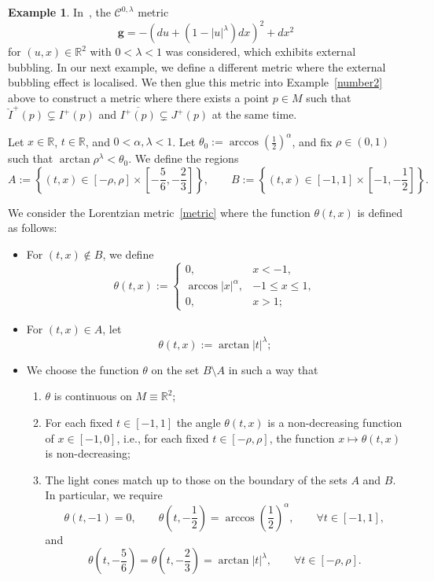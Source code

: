 \documentclass[reqno]{amsart}
\numberwithin{equation}{section}
\theoremstyle{plain}
\theoremstyle{definition}
\newtheorem{example}[theorem]{Example}
\theoremstyle{remark}
\newcommand\g{\ensuremath{\mathbf{g}}}
\newcommand\R{\ensuremath{\mathbb{R}}}
\renewcommand\le{\leqslant}
\newcommand\bel[1]{\begin{equation}\label{#1}}
\newcommand\ee{\end{equation}}
\begin{document}
\begin{example}
\label{number3}
In~\cite{CG:12}, the $\mathcal{C}^{0, \lambda}$ metric 
\bel{CGmetric}
\g = - \left( du + \left( 1 - |u|^{\lambda} \right) dx \right)^2 + dx^2
\ee
for $(u, x) \in \R^2$ with $0 < \lambda < 1$ was considered, which exhibits external bubbling. In our next example, we define a different metric where the external bubbling effect is localised. We then glue this metric into Example~\ref{number2} above to construct a metric where there exists a point $p \in M$ such that $\check{I}^+(p) \subsetneq I^+(p)$ and $\overline{I^+(p)} \subsetneq J^+(p)$ at the same time. 

Let $x \in \R$, $t \in \R$, and $0 < \alpha, \lambda < 1$. Let $\theta_0 := \arccos \left( \frac{1}{2} \right)^{\alpha}$, and fix $\rho \in \left( 0, 1 \right)$ such that $\arctan \rho^{\lambda} < \theta_0$. We define the regions 
\[
A := \left\{ (t, x) \in \left[ -\rho, \rho \right] \times \left[ -\frac{5}{6}, -\frac{2}{3} \right] \right\}, \qquad 
B := \left\{ (t, x) \in \left[ -1, 1 \right] \times \left[ -1, -\frac{1}{2} \right] \right\}. 
\]

We consider the Lorentzian metric~\eqref{metric} where the function $\theta(t, x)$ is defined as follows: 
\begin{itemize}
\item[$\bullet$] For $(t, x) \not\in B$, we define 
\[
\theta(t, x) := \begin{cases} 0, &x < -1, \\ 
\arccos |x|^{\alpha}, &-1 \le x \le 1, \\ 
0, & x > 1; \end{cases}
\]
\item[$\bullet$] For $(t, x) \in A$, let 
\[
\theta(t, x) := \arctan |t|^{\lambda}; 
\]
\item[$\bullet$] We choose the function $\theta$ on the set $B \setminus A$ in such a way that 
\begin{enumerate}[label={(\roman*). }, itemsep=2mm]
\medskip
\item $\theta$ is continuous on $M \equiv \R^2$; 
\item For each fixed $t \in [-1, 1]$ the angle $\theta(t, x)$ is a non-decreasing function of $x \in [-1, 0]$, i.e., for each fixed $t \in \left[ - \rho, \rho \right]$, the function $x \mapsto \theta(t, x)$ is non-decreasing; 
\item The light cones match up to those on the boundary of the sets $A$ and $B$. In particular, we require
\[
\theta\left( t, -1 \right) = 0, \qquad \theta\left( t, -\frac{1}{2} \right) = \arccos \left( \frac{1}{2} \right)^{\alpha}, \qquad \forall t \in [-1, 1], 
\]
and
\[
\theta\left( t, -\frac{5}{6} \right) = \theta\left( t, -\frac{2}{3} \right) = \arctan |t|^{\lambda}, \qquad \forall t \in [-\rho, \rho]. 
\]
\end{enumerate}
\end{itemize}


\end{example}
\end{document}
